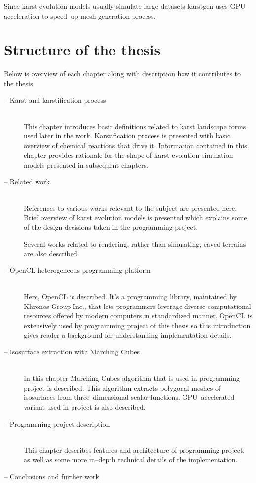 Since karst evolution models usually simulate large datasets karstgen uses
GPU acceleration to speed--up mesh generation process.

\pagebreak
\section{Structure of the thesis}

Below is overview of each chapter along with description how it contributes to
the thesis.
\begin{description}
  \item[ -- Karst and karstification process] \hfill \\
    This chapter introduces basic definitions related to karst landscape forms
    used later in the work. Karstification process is presented with basic
    overview of chemical reactions that drive it. Information contained in this
    chapter provides rationale for the shape of karst evolution simulation
    models presented in subsequent chapters.
  \item[ -- Related work] \hfill \\
    References to various works relevant to the subject are presented here.
    Brief overview of karst evolution models is presented which explains some
    of the design decisions taken in the programming project.

    Several works related to rendering, rather than simulating, caved terrains
    are also described.
  \item[ -- OpenCL heterogeneous programming platform] \hfill \\
    Here, OpenCL is described. It's a programming library, maintained by Khronos
    Group Inc., that lets programmers leverage diverse computational resources
    offered by modern computers in standardized manner. OpenCL is extensively
    used by programming project of this thesis so this introduction gives
    reader a background for understanding implementation details.
  \item[ -- Isosurface extraction with Marching Cubes] \hfill \\
    In this chapter Marching Cubes algorithm that is used in programming project
    is described. This algorithm extracts polygonal meshes of isosurfaces from
    three--dimensional scalar functions. GPU--accelerated variant used in
    project is also described.
  \item[ -- Programming project description] \hfill \\
    This chapter describes features and architecture of programming project, as
    well as some more in--depth technical details of the implementation.
  \item[ -- Conclusions and further work] \hfill \\

\end{description}

